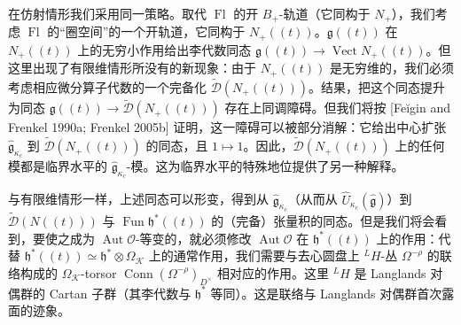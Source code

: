 在仿射情形我们采用同一策略。取代 $\operatorname{Fl}$ 的开 $B_+$-轨道（它同构于 $N_+$），我们考虑 $\operatorname{Fl}$ 的“圈空间”的一个开轨道，它同构于 $N_+((t))$。$\mathfrak{g}((t))$ 在 $N_+((t))$ 上的无穷小作用给出李代数同态 $\mathfrak{g}((t))\to\operatorname{Vect}N_+((t))$。但这里出现了有限维情形所没有的新现象：由于 $N_+((t))$ 是无穷维的，我们必须考虑相应微分算子代数的一个完备化 $\widetilde{\mathcal{D}}(N_+((t)))$。结果，把这个同态提升为同态 $\mathfrak{g}((t))\to\widetilde{\mathcal{D}}(N_+((t)))$ 存在上同调障碍。但我们将按 [Feĭgin and Frenkel 1990a; Frenkel 2005b] 证明，这一障碍可以被部分消解：它给出中心扩张 $\hat{\mathfrak{g}}_{\kappa_c}$ 到 $\widetilde{\mathcal{D}}(N_+((t)))$ 的同态，且 $1\mapsto1$。因此，$\widetilde{\mathcal{D}}(N_+((t)))$ 上的任何模都是临界水平的 $\hat{\mathfrak{g}}_{\kappa_c}$-模。这为临界水平的特殊地位提供了另一种解释。

与有限维情形一样，上述同态可以形变，得到从 $\hat{\mathfrak{g}}_{\kappa_c}$（从而从 $\widehat{U}_{\kappa_c}(\hat{\mathfrak{g}})$）到 $\widetilde{\mathcal{D}}(N((t)))$ 与 $\operatorname{Fun}\mathfrak{h}^*((t))$ 的（完备）张量积的同态。但是我们将会看到，要使之成为 $\operatorname{Aut}\mathcal{O}$-等变的，就必须修改 $\operatorname{Aut}\mathcal{O}$ 在 $\mathfrak{h}^*((t))$ 上的作用：代替 $\mathfrak{h}^*((t))\simeq\mathfrak{h}^*\otimes\Omega_{\mathcal{K}}$ 上的通常作用，我们需要与去心圆盘上 ${}^LH$-丛 $\Omega^{-\rho}$ 的联络构成的 $\Omega_{\mathcal{K}}$-torsor $\operatorname{Conn}(\Omega^{-\rho})_{D^\times}$ 相对应的作用。这里 ${}^LH$ 是 Langlands 对偶群的 Cartan 子群（其李代数与 $\mathfrak{h}^*$ 等同）。这是联络与 Langlands 对偶群首次露面的迹象。


